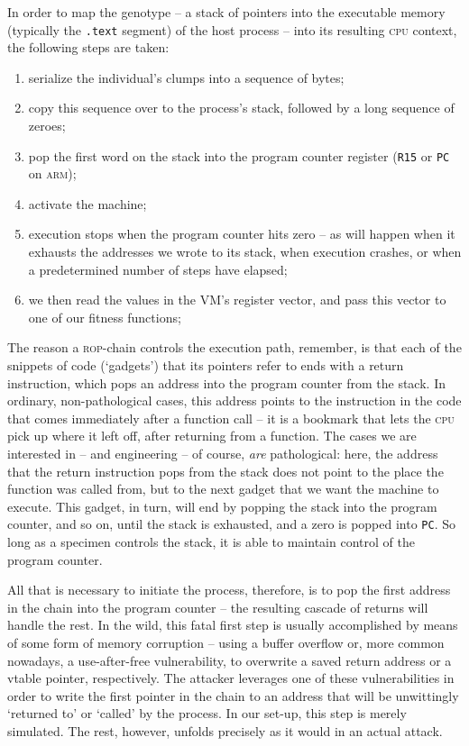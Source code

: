 In order to map the genotype -- a stack of pointers into the executable memory (typically the \texttt{.text} segment) of the host process -- into its resulting \textsc{cpu} context, the following steps are taken:
{\small
\begin{enumerate} 
  \item serialize the individual's clumps into a sequence of bytes;
  \item copy this sequence over to the process's stack, followed by a long sequence of zeroes;
  \item pop the first word on the stack into the program counter register (\texttt{R15} or \texttt{PC} on \textsc{arm});
  \item activate the machine;
  \item execution stops when the program counter hits zero -- as will happen when it exhausts the addresses we wrote to its stack, when execution crashes, or when a predetermined number of steps have elapsed;
  \item we then read the values in the VM's register vector, and pass this vector to one of our fitness functions;
\end{enumerate}
}
The reason a \textsc{rop}-chain controls the execution path,
remember, is that each of the snippets of code (`gadgets') that
its pointers refer to ends with a return instruction, which pops
an address into the program counter from the stack. In ordinary,
non-pathological cases, this address points to the instruction in
the code that comes immediately after a function call -- it is a
bookmark that lets the \textsc{cpu} pick up where it left off,
after returning from a function. The cases we are interested in --
and engineering -- of course, \emph{are} pathological: here, the
address that the return instruction pops from the stack does not
point to the place the function was called from, but to the next
gadget that we want the machine to execute. This gadget, in turn,
will end by popping the stack into the program counter, and so
on, until the stack is exhausted, and a zero is popped into
\texttt{PC}. So long as a specimen controls the stack, it is able
to maintain control of the program counter. 


All that is necessary to initiate the process, therefore, is to
pop the first address in the chain into the program counter --
the resulting cascade of returns will handle the rest. In the
wild, this fatal first step is usually accomplished by means of
some form of memory corruption -- using a buffer overflow or,
more common nowadays, a use-after-free vulnerability, to
overwrite a saved return address or a vtable pointer,
respectively.  The attacker leverages one of these
vulnerabilities in order to write the first pointer in the chain
to an address that will be unwittingly `returned to' or `called'
by the process. In our set-up, this step is merely simulated. The
rest, however, unfolds precisely as it would in an actual
attack.

